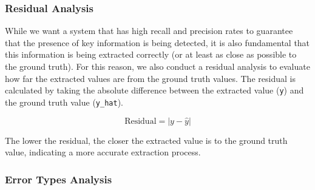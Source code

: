 \documentclass[english, 12pt, a4paper, elec, utf8, a-2b, online]{aaltothesis}
\begin{document}
%
%
%

\subsubsection{Residual Analysis}

While we want a system that has high recall and precision rates to guarantee that the presence of key information is being detected, it is also fundamental that this information is being extracted correctly (or at least as close as possible to the ground truth).
For this reason, we also conduct a residual analysis to evaluate how far the extracted values are from the ground truth values.
The residual is calculated by taking the absolute difference between the extracted value (\texttt{y}) and the ground truth value (\texttt{y\_hat}).

\begin{equation}
    \text{Residual} = |y - \hat{y}|
\end{equation}

The lower the residual, the closer the extracted value is to the ground truth value, indicating a more accurate extraction process.

\subsubsection{Error Types Analysis}
\end{document}
